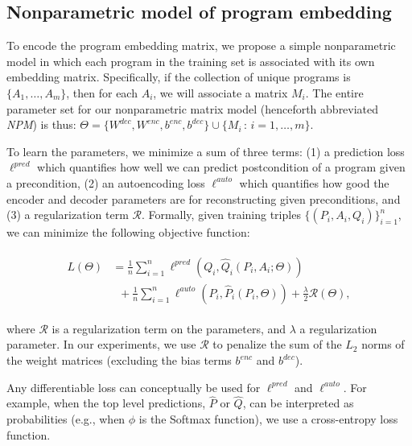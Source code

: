 \subsection{Nonparametric model of program embedding}\label{sec:nonparametric}
To encode the program embedding matrix, we propose a simple
nonparametric model in which each program in the training set is associated
with its own embedding matrix.
Specifically, if the collection of unique programs
is $\{A_1,\dots,A_m\}$, then for each $A_i$, we will associate a matrix $M_i$.
The entire parameter set for our nonparametric
matrix model (henceforth abbreviated \emph{NPM}) is thus:
$\Theta=\{W^{dec}, W^{enc}, b^{enc}, b^{dec}\}\cup\{M_i\,:\,i=1,\dots,m\}$.

To learn the parameters, we minimize a sum of three terms: (1) a prediction loss
$\ell^{pred}$ which quantifies how well we can predict postcondition of a program 
given a precondition, (2) an autoencoding loss $\ell^{auto}$ which quantifies how good 
the encoder and decoder parameters are for reconstructing given preconditions, and (3) a regularization term $\mathcal{R}$.
Formally, given training triples $\{(P_i, A_i, Q_i)\}_{i=1}^n$,
we can minimize the following objective function:

{
\begin{align}
\begin{split}
L(\Theta) &=  \frac{1}{n} \sum_{i=1}^n 
                \ell^{pred}(Q_i, \hat{Q}_i(P_i, A_i; \Theta)) \\
    &\;\;+  \frac{1}{n} \sum_{i=1}^n 
                    \ell^{auto}(P_i, \hat{P}_i(P_i, \Theta)) 
    + \frac{\lambda}{2}\mathcal{R}(\Theta), \label{eqn:objective}
  \end{split}
\end{align}
}

where
$\mathcal{R}$ is a regularization term on the parameters,
and $\lambda$ a regularization parameter.
In our experiments, we use $\mathcal{R}$ to penalize the sum of the $L_2$ norms of the
weight matrices (excluding the bias terms $b^{enc}$ and $b^{dec}$).

Any differentiable loss can conceptually be used for $\ell^{pred}$ and
$\ell^{auto}$.  For example,
when the top level predictions, $\hat{P}$ or $\hat{Q}$,
can be interpreted as probabilities (e.g., when $\phi$ is
the Softmax function), we use a cross-entropy loss function.



